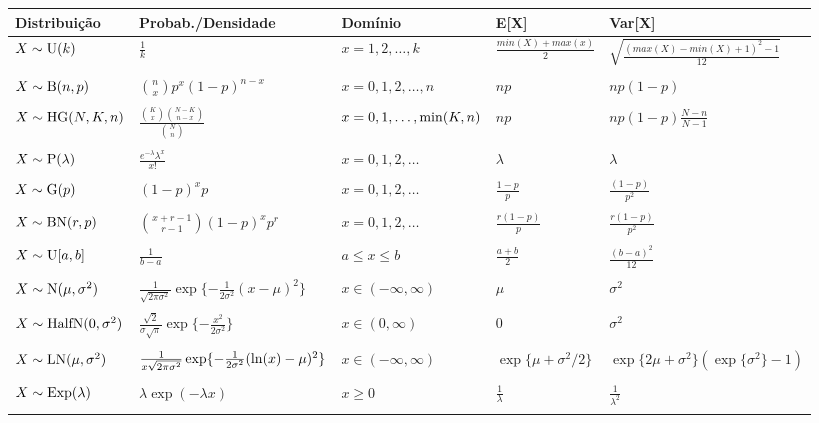\begin{tabular}{lllll} 
\hline
Distribuição & Probab./Densidade & Domínio & E[X] & Var[X] \\
\hline
$X \sim {\rm U}(k)$ & $\frac{1}{k}$ & $x=1, 2, \ldots, k$  & $\frac{min(X) + max(x)}{2}$ & $\sqrt{\frac{(max(X) - min(X) + 1)^2 -1}{12}}$  \\
\\
$X \sim {\rm B}(n,p)$ & $\binom{n}{x} p^x (1-p)^{n-x}$ & $x=0, 1, 2, \ldots, n$ 
&  $np$ & $np(1-p)$ \\
\\
$X \sim {\rm HG}(N, K, n)$ & $\frac{\binom{K}{x}\binom{N-K}{n-x}}{\binom{N}{n}}$ &  $x=0, 1, \ldots, {\rm min}(K,n)$ & $np$ & $np(1-p)\frac{N-n}{N-1}$ \\
\\
$X \sim {\rm P}(\lambda)$ &  $\frac{e^{-\lambda} \lambda^x}{x!}$ & $x=0, 1, 2, \ldots$ & $\lambda$ & $\lambda$ \\
\\
$X \sim {\rm G}(p)$ &  $(1-p)^{x}p$ & $x=0, 1, 2, \ldots$
& $\frac{1-p}{p}$ & $\frac{(1-p)}{p^2}$ \\
\\
$X \sim {\rm BN}(r,p)$ &  $\binom{x+r-1}{r-1} (1-p)^{x} p^r$ & $x=0, 1, 2, \ldots$ 
& $\frac{r(1-p)}{p}$ & $\frac{r(1-p)}{p^2}$ \\
\\
\hline
$X \sim {\rm U}[a,b]$ & $\frac{1}{b-a}$ & $a \leq x \leq b$ & $\frac{a+b}{2}$ & $\frac{(b-a)^2}{12}$ \\
\\
$X \sim {\rm N}(\mu, \sigma^2)$ &  $\frac{1}{\sqrt{2\pi\sigma^2}}\exp\{-\frac{1}{2\sigma^2}(x - \mu)^2\}$ & $x \in (-\infty, \infty)$ & $\mu$ & $\sigma^2$ \\
\\
$X \sim {\rm HalfN}(0, \sigma^2)$ &  $\frac{\sqrt{2}}{\sigma\sqrt{\pi}}\exp\{-\frac{x^2}{2\sigma^2}\} $ & $x \in (0, \infty)$ & $0$ & $\sigma^2$ \\
\\
$X \sim {\rm LN}(\mu, \sigma^2)$ &  $\frac{1}{x \sqrt{2\pi\sigma^2}}\exp\{-\frac{1}{2\sigma^2}({\rm ln}(x) - \mu)^2\}$ & $x \in (-\infty, \infty)$ & $ \exp\{\mu + \sigma^2/2\}$ & $\exp\{2\mu + \sigma^2\}(\exp\{\sigma^2\} -1)$ \\
\\
$X \sim {\rm Exp}(\lambda)$ & $ \lambda\exp(-\lambda x)$ & $x \geq 0$ & 
$ \frac{1}{\lambda}$ & $\frac{1}{\lambda^2}$ \\
\\

\end{tabular}
